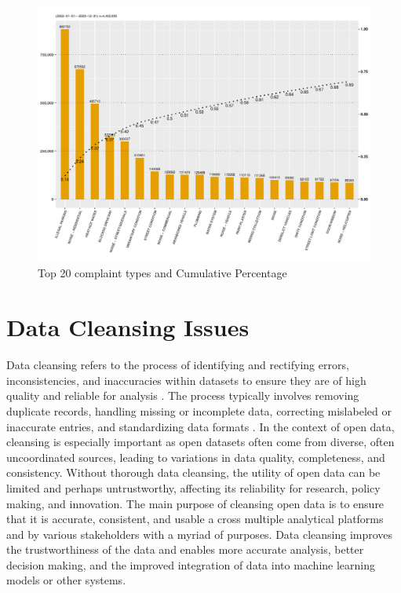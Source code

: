 \documentclass[linenumber]{jdsart}
\begin{document}
\begin{figure}[tbp]
 \centering
  \includegraphics[width = \textwidth]{SR_by_Complaint_Type.pdf} 
  \caption{Top 20 complaint types and Cumulative Percentage} 
  \label{fig:SR_complaints}
\end{figure}


\section{Data Cleansing Issues} 
\label{sec:issues}
Data cleansing refers to the process of identifying and rectifying
errors, inconsistencies, and inaccuracies within datasets to ensure
they are of high quality and reliable for analysis
\citep{maletic2005data, hosseinzadeh2023data}. The process
typically involves removing duplicate records, handling missing or
incomplete data, correcting mislabeled or inaccurate entries, and
standardizing data formats \citep[e.g.,][]{cody2017cody,
  van2018statistical}. In the context of open data, cleansing is
especially important as open datasets often come from diverse,
often uncoordinated sources, leading to variations in data quality,
completeness, and consistency. Without thorough data cleansing, 
the utility of open data can be limited and perhaps 
untrustworthy, affecting its reliability for research, 
policy making, and innovation. The main purpose of cleansing 
open data is to ensure that it is accurate, consistent, and usable a
cross multiple analytical platforms and by various stakeholders with a 
myriad of purposes. Data cleansing improves the trustworthiness 
of the data and enables more accurate analysis, 
better decision making, and the improved integration of 
data into machine learning models or other systems.
\end{document}
